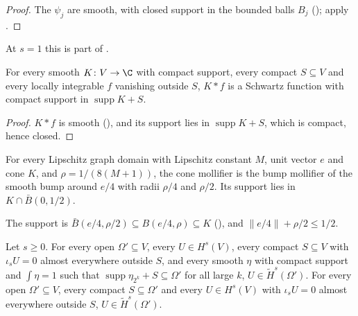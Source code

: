 \begin{proof}
\leanok
The $\psi_j$ are smooth, with closed support in the bounded balls $B_j$
(); apply .
\end{proof}

At $s = 1$ this is part of .

\begin{lemma}
\label{lem:smoothing-compact-support}
\leanok
{}
For every smooth $K \colon V \to \C$ with compact support, every compact $S \subseteq V$ and
every locally integrable $f$ vanishing outside $S$, $K * f$ is a Schwartz function with compact
support in $\operatorname{supp} K + S$.
\end{lemma}

\begin{proof}
\leanok
$K * f$ is smooth (), and its support lies in
$\operatorname{supp} K + S$, which is compact, hence closed.
\end{proof}

\begin{definition}
\label{def:cone-mollifier}
\leanok
{}
For every Lipschitz graph domain with Lipschitz constant $M$, unit vector $e$ and cone $K$, and
$\rho = 1/(8(M + 1))$, the cone mollifier is the bump mollifier of the smooth bump around $e/4$
with radii $\rho/4$ and $\rho/2$. Its support lies in $K \cap \bar B(0, 1/2)$.
\end{definition}

The support is $\bar B(e/4, \rho/2) \subseteq B(e/4, \rho) \subseteq K$ (),
and $\|e/4\| + \rho/2 \leq 1/2$.

\begin{theorem}
\label{thm:tilde-space-mollified-general}
\leanok
{}
Let $s \geq 0$. For every open $\Omega' \subseteq V$, every $U \in H^s(V)$, every compact
$S \subseteq V$ with $\iota_s U = 0$ almost everywhere outside $S$, and every smooth $\eta$ with
compact support and $\int \eta = 1$ such that $\operatorname{supp} \eta_{2^k} + S \subseteq
\Omega'$ for all large $k$, $U \in \tilde H^s(\Omega')$. For every open $\Omega' \subseteq V$,
every compact $S \subseteq \Omega'$ and every $U \in H^s(V)$ with $\iota_s U = 0$ almost
everywhere outside $S$, $U \in \tilde H^s(\Omega')$.
\end{theorem}

